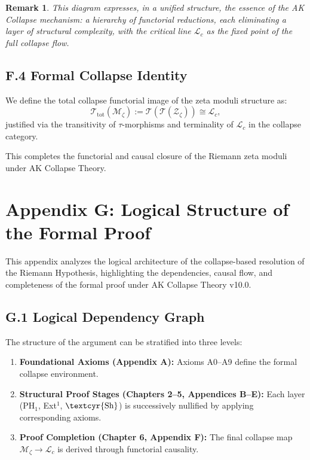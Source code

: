 \documentclass[11pt]{article}
\newtheorem{remark}[theorem]{Remark}
\newcommand{\Sha}{\text{\textcyr{Sh}}}
\begin{document}
\begin{remark}
This diagram expresses, in a unified structure, the essence of the AK Collapse mechanism:  
a hierarchy of functorial reductions, each eliminating a layer of structural complexity,  
with the critical line $\mathcal{L}_c$ as the fixed point of the full collapse flow.
\end{remark}

\subsection*{F.4 Formal Collapse Identity}

We define the total collapse functorial image of the zeta moduli structure as:
\[
\mathcal{T}_{\text{tot}}(\mathcal{M}_\zeta) := \mathcal{T}(\mathcal{T}(\mathcal{Z}_\zeta)) \cong \mathcal{L}_c,
\]
justified via the transitivity of $\tau$-morphisms and terminality of $\mathcal{L}_c$ in the collapse category.

This completes the functorial and causal closure of the Riemann zeta moduli under AK Collapse Theory.



\section*{Appendix G: Logical Structure of the Formal Proof}

This appendix analyzes the logical architecture of the collapse-based resolution of the Riemann Hypothesis,  
highlighting the dependencies, causal flow, and completeness of the formal proof under AK Collapse Theory v10.0.

\subsection*{G.1 Logical Dependency Graph}

The structure of the argument can be stratified into three levels:

\begin{enumerate}
    \item \textbf{Foundational Axioms (Appendix A):} Axioms A0–A9 define the formal collapse environment.
    \item \textbf{Structural Proof Stages (Chapters 2–5, Appendices B–E):}  
    Each layer (PH$_1$, Ext$^1$, $\Sha$) is successively nullified by applying corresponding axioms.
    \item \textbf{Proof Completion (Chapter 6, Appendix F):}  
    The final collapse map $\mathcal{M}_\zeta \to \mathcal{L}_c$ is derived through functorial causality.
\end{enumerate}
\end{document}
